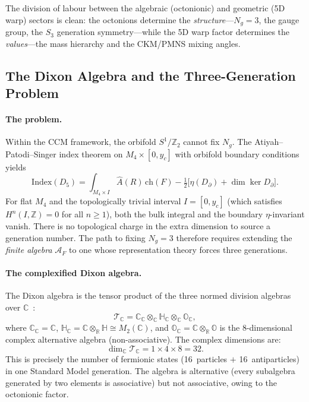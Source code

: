The division of labour between the algebraic (octonionic) and geometric (5D warp) sectors is clean: the octonions determine the \emph{structure}---$N_g = 3$, the gauge group, the $S_3$ generation symmetry---while the 5D warp factor determines the \emph{values}---the mass hierarchy and the CKM/PMNS mixing angles.


\subsection{The Dixon Algebra and the Three-Generation Problem}
\label{sec:4-dixon}

\paragraph{The problem.}
Within the CCM framework, the orbifold $S^1/\mathbb{Z}_2$ cannot fix $N_g$. The Atiyah--Patodi--Singer index theorem on $M_4 \times [0, y_c]$ with orbifold boundary conditions yields
\begin{equation}
  \mathrm{Index}(D_5) = \int_{M_4 \times I} \hat{A}(R)\, \mathrm{ch}(F) - \tfrac{1}{2}\bigl[\eta(D_{\partial}) + \dim\ker D_{\partial}\bigr].
  \label{eq:4-75}
\end{equation}
For flat $M_4$ and the topologically trivial interval $I = [0, y_c]$ (which satisfies $H^n(I, \mathbb{Z}) = 0$ for all $n \geq 1$), both the bulk integral and the boundary $\eta$-invariant vanish. There is no topological charge in the extra dimension to source a generation number. The path to fixing $N_g = 3$ therefore requires extending the \emph{finite algebra} $\mathcal{A}_F$ to one whose representation theory forces three generations.

\paragraph{The complexified Dixon algebra.}
The Dixon algebra is the tensor product of the three normed division algebras over $\mathbb{C}$~\cite{ch4:Furey2025,ch4:Dixon1994}:
\begin{equation}
  \mathcal{T}_{\mathbb{C}} = \mathbb{C}_{\mathbb{C}} \otimes_{\mathbb{C}} \mathbb{H}_{\mathbb{C}} \otimes_{\mathbb{C}} \mathbb{O}_{\mathbb{C}},
  \label{eq:4-76}
\end{equation}
where $\mathbb{C}_{\mathbb{C}} = \mathbb{C}$, $\mathbb{H}_{\mathbb{C}} = \mathbb{C} \otimes_{\mathbb{R}} \mathbb{H} \cong M_2(\mathbb{C})$, and $\mathbb{O}_{\mathbb{C}} = \mathbb{C} \otimes_{\mathbb{R}} \mathbb{O}$ is the 8-dimensional complex alternative algebra (non-associative). The complex dimensions are:
\begin{equation}
  \dim_{\mathbb{C}} \mathcal{T}_{\mathbb{C}} = 1 \times 4 \times 8 = 32.
  \label{eq:4-77}
\end{equation}
This is precisely the number of fermionic states (16~particles $+$ 16~antiparticles) in one Standard Model generation. The algebra is alternative (every subalgebra generated by two elements is associative) but not associative, owing to the octonionic factor.

